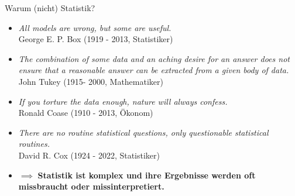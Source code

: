 \documentclass[
  10pt,
  ignorenonframetext,
]{beamer}
\providecommand{\tightlist}{%
  \setlength{\itemsep}{0pt}\setlength{\parskip}{0pt}}
\begin{document}
\begin{frame}{Warum (nicht) Statistik?}
\label{warum-nicht-statistik}
\begin{itemize}[<+->]
\tightlist
\item
  \emph{All models are wrong, but some are useful.}\\
  George E. P. Box (1919 - 2013, Statistiker)
\item
  \emph{The combination of some data and an aching desire for an answer
  does not ensure that a reasonable answer can be extracted from a given
  body of data.}\\
  John Tukey (1915- 2000, Mathematiker)
\item
  \emph{If you torture the data enough, nature will always confess.}\\
  Ronald Coase (1910 - 2013, Ökonom)
\item
  \emph{There are no routine statistical questions, only questionable
  statistical routines.}\\
  David R. Cox (1924 - 2022, Statistiker)
\end{itemize}

\begin{itemize}[<+->]
\tightlist
\item
  \(\implies\) \textbf{Statistik ist komplex und ihre Ergebnisse werden
  oft missbraucht oder missinterpretiert.}
\end{itemize}
\end{frame}
\end{document}
